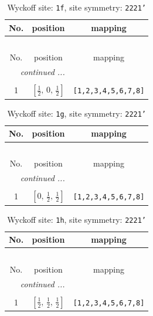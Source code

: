 \documentclass[fleqn,8pt]{jsarticle}
\begin{document}
\renewcommand{\arraystretch}{1.2}
\begin{longtable}{ccc}
\caption{Wyckoff site: {\tt 1f}, site symmetry: {\tt 2221'}}
 \\
 \hline \hline
No. & position & mapping \\ \hline \endfirsthead

\multicolumn{2}{l}{\tablename\ \thetable{}} \\
 \hline \hline
No. & position & mapping \\ \hline \endhead

 \hline \hline
\multicolumn{2}{r}{\footnotesize\it continued ...} \\ \endfoot

 \hline \hline
\multicolumn{2}{r}{} \\ \endlastfoot

1 & $\left[ \frac{1}{2},\, 0,\, \frac{1}{2} \right]$ & {\tt [1,2,3,4,5,6,7,8]} \\
\end{longtable}
\renewcommand{\arraystretch}{1.2}
\begin{longtable}{ccc}
\caption{Wyckoff site: {\tt 1g}, site symmetry: {\tt 2221'}}
 \\
 \hline \hline
No. & position & mapping \\ \hline \endfirsthead

\multicolumn{2}{l}{\tablename\ \thetable{}} \\
 \hline \hline
No. & position & mapping \\ \hline \endhead

 \hline \hline
\multicolumn{2}{r}{\footnotesize\it continued ...} \\ \endfoot

 \hline \hline
\multicolumn{2}{r}{} \\ \endlastfoot

1 & $\left[ 0,\, \frac{1}{2},\, \frac{1}{2} \right]$ & {\tt [1,2,3,4,5,6,7,8]} \\
\end{longtable}
\renewcommand{\arraystretch}{1.2}
\begin{longtable}{ccc}
\caption{Wyckoff site: {\tt 1h}, site symmetry: {\tt 2221'}}
 \\
 \hline \hline
No. & position & mapping \\ \hline \endfirsthead

\multicolumn{2}{l}{\tablename\ \thetable{}} \\
 \hline \hline
No. & position & mapping \\ \hline \endhead

 \hline \hline
\multicolumn{2}{r}{\footnotesize\it continued ...} \\ \endfoot

 \hline \hline
\multicolumn{2}{r}{} \\ \endlastfoot

1 & $\left[ \frac{1}{2},\, \frac{1}{2},\, \frac{1}{2} \right]$ & {\tt [1,2,3,4,5,6,7,8]} \\
\end{longtable}
\end{document}
